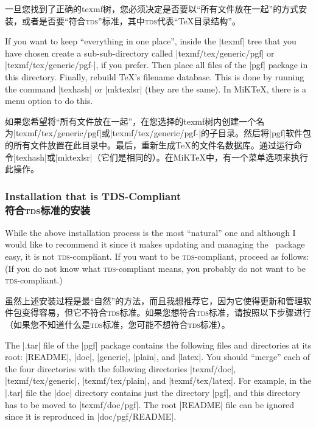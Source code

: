 一旦您找到了正确的texmf树，您必须决定是否要以“所有文件放在一起”的方式安装\pgfname，或者是否要“符合\textsc{tds}”标准，其中\textsc{tds}代表“\TeX 目录结构”。

If you want to keep ``everything in one place'', inside the |texmf| tree that
you have chosen create a sub-sub-directory called |texmf/tex/generic/pgf| or
|texmf/tex/generic/pgf-|\texttt{\pgfversion}, if you prefer. Then place all
files of the |pgf| package in this directory. Finally, rebuild \TeX's filename
database. This is done by running the command |texhash| or |mktexlsr| (they are
the same). In MiK\TeX, there is a menu option to do this.

如果您希望将“所有文件放在一起”，在您选择的texmf树内创建一个名为|texmf/tex/generic/pgf|或|texmf/tex/generic/pgf-|\texttt{\pgfversion}的子目录。然后将|pgf|软件包的所有文件放置在此目录中。最后，重新生成\TeX 的文件名数据库。通过运行命令|texhash|或|mktexlsr|（它们是相同的）。在MiK\TeX 中，有一个菜单选项来执行此操作。


\subsubsection{Installation that is TDS-Compliant\\符合\textsc{tds}标准的安装}

While the above installation process is the most ``natural'' one and although I
would like to recommend it since it makes updating and managing the \pgfname\
package easy, it is not \textsc{tds}-compliant. If you want to be
\textsc{tds}-compliant, proceed as follows: (If you do not know what
\textsc{tds}-compliant means, you probably do not want to be
\textsc{tds}-compliant.)

虽然上述安装过程是最“自然”的方法，而且我想推荐它，因为它使得更新和管理\pgfname 软件包变得容易，但它不符合\textsc{tds}标准。如果您想符合\textsc{tds}标准，请按照以下步骤进行（如果您不知道什么是\textsc{tds}标准，您可能不想符合\textsc{tds}标准）。

The |.tar| file of the |pgf| package contains the following files and
directories at its root: |README|, |doc|,  |generic|, |plain|, and |latex|. You
should ``merge'' each of the four directories with the following directories
|texmf/doc|, |texmf/tex/generic|, |texmf/tex/plain|, and |texmf/tex/latex|. For
example, in the |.tar| file the |doc| directory contains just the directory
|pgf|, and this directory has to be moved to |texmf/doc/pgf|. The root |README|
file can be ignored since it is reproduced in |doc/pgf/README|.

